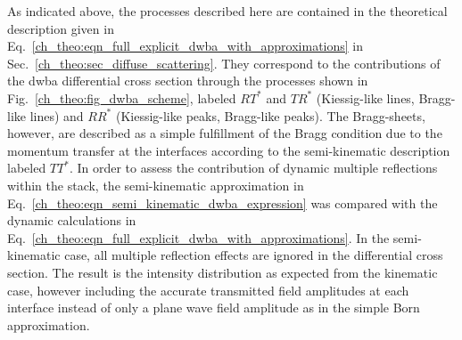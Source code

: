 As indicated above, the processes described here are contained in the theoretical description given in Eq.~\eqref{ch_theo:eqn_full_explicit_dwba_with_approximations} in Sec.~\ref{ch_theo:sec_diffuse_scattering}. They correspond to the contributions of the \gls{dwba} differential cross section through the processes shown in Fig.~\ref{ch_theo:fig_dwba_scheme}, labeled $R T^*$ and $T R^*$ (Kiessig-like lines, Bragg-like lines) and $R R^*$ (Kiessig-like peaks, Bragg-like peaks). The Bragg-sheets, however, are described as a simple fulfillment of the Bragg condition due to the momentum transfer at the interfaces according to the semi-kinematic description labeled $T T^*$. In order to assess the contribution of dynamic multiple reflections within the stack, the semi-kinematic approximation in Eq.~\eqref{ch_theo:eqn_semi_kinematic_dwba_expression} was compared with the dynamic calculations in Eq.~\eqref{ch_theo:eqn_full_explicit_dwba_with_approximations}. In the semi-kinematic case, all multiple reflection effects are ignored in the differential cross section. The result is the intensity distribution as expected from the kinematic case, however including the accurate transmitted field amplitudes at each interface instead of only a plane wave field amplitude as in the simple Born approximation. 

